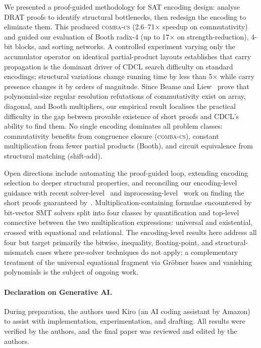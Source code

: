 \documentclass[a4paper]{ceurart}
\newcommand{\combacs}{\textsc{comba-cs}\xspace}
\begin{document}
We presented a proof-guided methodology for SAT encoding design:
analyse DRAT proofs to identify structural bottlenecks, then
redesign the encoding to eliminate them. This produced \combacs
(2.6--71$\times$ speedup on commutativity) and guided our
evaluation of Booth radix-4 (up to 17$\times$ on
strength-reduction), 4-bit blocks, and sorting networks. A
controlled experiment varying only the accumulator operator on
identical partial-product layouts establishes that carry
propagation is the dominant driver of CDCL search difficulty on
standard encodings; structural variations change running time by
less than 5$\times$ while carry presence changes it by orders of
magnitude. Since Beame and Liew~\cite{beame2019toward} prove that
polynomial-size regular resolution refutations of commutativity
exist on array, diagonal, and Booth multipliers, our empirical
result localises the practical difficulty in the gap between
provable existence of short proofs and CDCL's ability to find
them. No single encoding dominates all problem classes:
commutativity benefits from congruence closure (\combacs),
constant multiplication from fewer partial products (Booth), and
circuit equivalence from structural matching (shift-add).

Open directions include automating the proof-guided loop,
extending encoding selection to deeper structural properties,
and reconciling our encoding-level guidance with recent
solver-level~\cite{danner2025sat} and
inprocessing-level~\cite{pollitt2026factoring} work on finding
the short proofs guaranteed by~\cite{beame2019toward}.
Multiplication-containing formulae encountered by bit-vector SMT
solvers split into four classes by quantification and top-level
connective between the two multiplication expressions: universal
and existential, crossed with equational and relational. The
encoding-level results here address all four but target primarily
the bitwise, inequality, floating-point, and structural-mismatch
cases where pre-solver techniques do not apply; a complementary
treatment of the universal equational fragment via Gr\"obner
bases and vanishing polynomials is the subject of ongoing work.

\paragraph{Declaration on Generative AI.}
During preparation, the authors used Kiro (an AI coding assistant
by Amazon) to assist with implementation, experimentation, and
drafting. All results were verified by the authors, and the
final paper was reviewed and edited by the authors.
\end{document}
